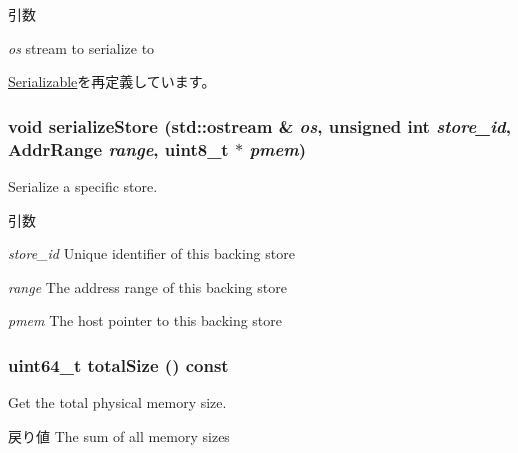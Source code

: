 \begin{DoxyParams}{引数}
\item[{\em os}]stream to serialize to \end{DoxyParams}


\hyperlink{classSerializable_ad6272f80ae37e8331e3969b3f072a801}{Serializable}を再定義しています。\hypertarget{classPhysicalMemory_adda88c8306de32c98ea608a0a85c3dcd}{
\subsubsection[{serializeStore}]{\setlength{\rightskip}{0pt plus 5cm}void serializeStore (std::ostream \& {\em os}, \/  unsigned int {\em store\_\-id}, \/  {\bf AddrRange} {\em range}, \/  uint8\_\-t $\ast$ {\em pmem})}}
\label{classPhysicalMemory_adda88c8306de32c98ea608a0a85c3dcd}
Serialize a specific store.


\begin{DoxyParams}{引数}
\item[{\em store\_\-id}]Unique identifier of this backing store \item[{\em range}]The address range of this backing store \item[{\em pmem}]The host pointer to this backing store \end{DoxyParams}
\hypertarget{classPhysicalMemory_a990c48a7ad4a4821fe4f04a1e58845a6}{
\subsubsection[{totalSize}]{\setlength{\rightskip}{0pt plus 5cm}uint64\_\-t totalSize () const}}
\label{classPhysicalMemory_a990c48a7ad4a4821fe4f04a1e58845a6}
Get the total physical memory size.

\begin{DoxyReturn}{戻り値}
The sum of all memory sizes 
\end{DoxyReturn}



